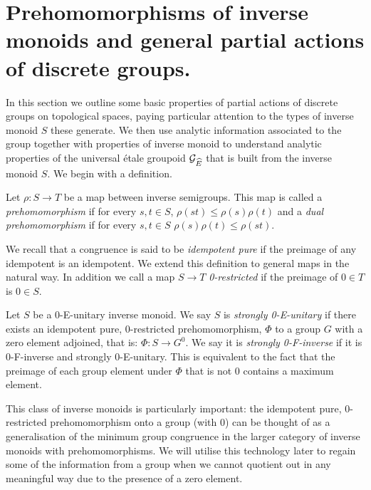\section{Prehomomorphisms of inverse monoids and general partial actions of discrete groups.}\label{Sect:S3} 
In this section we outline some basic properties of partial actions of discrete groups on topological spaces, paying particular attention to the types of inverse monoid $S$ these generate. We then use analytic information associated to the group together with properties of inverse monoid to understand analytic properties of the universal \'etale groupoid $\mathcal{G}_{\widehat{E}}$ that is built from the inverse monoid $S$. We begin with a definition.

\begin{definition}
Let $\rho: S \rightarrow T$ be a map between inverse semigroups. This map is called a \textit{prehomomorphism} if for every $s,t \in S$, $\rho(st) \leq \rho(s)\rho(t)$ and a \textit{dual prehomomorphism} if for every $s,t \in S$ $\rho(s)\rho(t) \leq \rho(st)$.
\end{definition}

We recall that a congruence is said to be \textit{idempotent pure} if the preimage of any idempotent is an idempotent. We extend this definition to general maps in the natural way. In addition we call a map $S \rightarrow T$ \textit{0-restricted} if the preimage of $0 \in T$ is $0 \in S$.

\begin{definition}
Let $S$ be a 0-E-unitary inverse monoid. We say $S$ is \textit{strongly 0-E-unitary} if there exists an idempotent pure, 0-restricted prehomomorphism, $\Phi$ to a group $G$ with a zero element adjoined, that is: $\Phi:S \rightarrow G^{0}$. We say it is \textit{strongly 0-F-inverse} if it is 0-F-inverse and strongly 0-E-unitary. This is equivalent to the fact that the preimage of each group element under $\Phi$ that is not $0$ contains a maximum element.
\end{definition}

This class of inverse monoids is particularly important: the idempotent pure, 0-restricted prehomomorphism onto a group (with 0) can be thought of as a generalisation of the minimum group congruence in the larger category of inverse monoids with prehomomorphisms. We will utilise this technology later to regain some of the information from a group when we cannot quotient out in any meaningful way due to the presence of a zero element.

